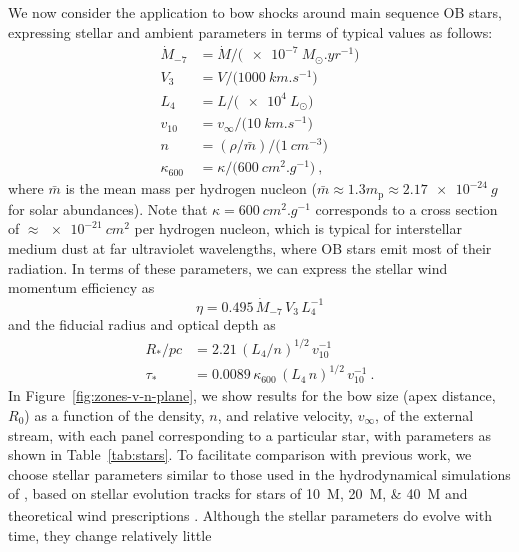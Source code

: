 We now consider the application to bow shocks around main sequence OB
stars, expressing stellar and ambient parameters in terms of typical
values as follows:
\begin{align*}
  \label{eq:stellar-parameters}
  \dot{M}_{-7} &= \dot{M} / \bigl(\SI{e-7}{M_\odot.yr^{-1}}\bigr) \\
  V_3 &= V / \bigl(\SI{1000}{km.s^{-1}}\bigr) \\
  L_4 &= L / \bigl(\SI{e4}{L_\odot}\bigr) \\
  v_{10} &= v_\infty / \bigl( \SI{10}{km.s^{-1}} \bigr) \\
  n &= (\rho / \bar{m}) / \bigl( \SI{1}{cm^{-3}} \bigr) \\
  \kappa_{600} &= \kappa / \bigl( \SI{600}{cm^2.g^{-1}} \bigr) \ ,
\end{align*}
where \(\bar{m}\) is the mean mass per hydrogen nucleon
(\(\bar{m} \approx 1.3 m_{\text{p}} \approx \SI{2.17e-24}{g}\) for solar
abundances).  Note that \(\kappa = \SI{600}{cm^2.g^{-1}}\) corresponds to a
cross section of \(\approx \SI{e-21}{cm^2}\) per hydrogen nucleon, which is
typical for interstellar medium dust \citep{Bertoldi:1996a} at far
ultraviolet wavelengths, where OB stars emit most of their radiation.
In terms of these parameters, we can express the stellar wind momentum
efficiency as
\begin{equation}
  \label{eq:wind-eta-typical}
  \eta = \num{0.495} \,\dot{M}_{-7} \,V_3  \,L_4^{-1}
\end{equation}
and the fiducial radius and optical depth as
\begin{align}
  \label{eq:Rstar-typical}
  R_* / \si{pc} &= \num{2.21} \, (L_4 / n)^{1/2} \,v_{10}^{-1} \\
  \label{eq:taustar-typical}
  \tau_* &= \num{0.0089} \,\kappa_{600} \, (L_4 \,n)^{1/2} \,v_{10}^{-1} \ .
\end{align}
In Figure~\ref{fig:zones-v-n-plane}, we show results for the bow size
(apex distance, \(R_0\)) as a function of the density, \(n\), and
relative velocity, \(v_\infty\), of the external stream, with each panel
corresponding to a particular star, with parameters as shown in
Table~\ref{tab:stars}.  To facilitate comparison with previous work,
we choose stellar parameters similar to those used in the
hydrodynamical simulations of \citet{Meyer:2014b, Meyer:2016a,
  Meyer:2017a}, based on stellar evolution tracks for stars of
\SIlist{10;20;40}{M_\odot} \citep{Brott:2011a} and theoretical wind
prescriptions \citep{de-Jager:1988a, Vink:2000a}.  Although the
stellar parameters do evolve with time, they change relatively little
